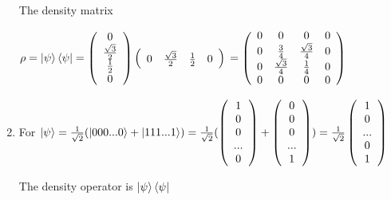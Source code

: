\documentclass{article}
\begin{document}
\begin{enumerate}
          The density matrix

          $\rho=\ket{\psi}\bra{\psi}=\left(\begin{array}{c}
                      0 \\\frac{\sqrt{3}}{2}\\\frac{1}{2}\\0
                  \end{array}\right)\left(\begin{array}{cccc}
                      0 & \frac{\sqrt{3}}{2} & \frac{1}{2} & 0
                  \end{array}\right)
              \\=\left(\begin{array}{cccc}
                      0 & 0                  & 0                  & 0 \\
                      0 & \frac{3}{4}        & \frac{\sqrt{3}}{4} & 0 \\
                      0 & \frac{\sqrt{3}}{4} & \frac{1}{4}        & 0 \\
                      0 & 0                  & 0                  & 0 \\
                  \end{array}\right)$


    \item For $\ket{\psi}=\frac{1}{\sqrt{2}}(\ket{000...0}+\ket{111...1})=\frac{1}{\sqrt{2}}(\left(\begin{array}{c}1\\0\\0\\...\\0\end{array}\right)+\left(\begin{array}{c}0\\0\\0\\...\\1\end{array}\right))=\frac{1}{\sqrt{2}}\left(\begin{array}{c}1\\0\\...\\0\\1\end{array}\right)$



          The density operator is $\ket{\psi}\bra{\psi}$


\end{enumerate}
\end{document}
